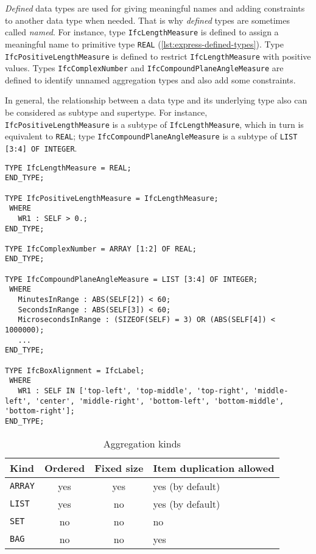 \emph{Defined} data types are used for giving meaningful names and adding constraints to another data type when needed.
That is why \emph{defined} types are sometimes called \emph{named}.
For instance, type \texttt{Ifc\-Length\-Measure} is defined to assign a meaningful name to primitive type \texttt{REAL} (\autoref{lst:express-defined-types}).
Type \texttt{Ifc\-Positive\-Length\-Measure} is defined to restrict \texttt{Ifc\-Length\-Measure} with positive values.
Types \texttt{Ifc\-Complex\-Number} and \texttt{Ifc\-Compound\-Plane\-Angle\-Measure} are defined to identify unnamed aggregation types and also add some constraints.

In general, the relationship between a data type and its underlying type also can be considered as subtype and supertype.
For instance, \texttt{IfcPositiveLengthMeasure} is a subtype of \texttt{IfcLengthMeasure}, which in turn is equivalent to \texttt{REAL}; type \texttt{IfcCompoundPlaneAngleMeasure} is a subtype of \texttt{LIST [3:4] OF INTEGER}.



\begin{lstlisting}[caption={Printout of several defined data types},label=lst:express-defined-types]
TYPE IfcLengthMeasure = REAL;
END_TYPE;

TYPE IfcPositiveLengthMeasure = IfcLengthMeasure;
 WHERE
   WR1 : SELF > 0.;
END_TYPE;

TYPE IfcComplexNumber = ARRAY [1:2] OF REAL;
END_TYPE;

TYPE IfcCompoundPlaneAngleMeasure = LIST [3:4] OF INTEGER;
 WHERE
   MinutesInRange : ABS(SELF[2]) < 60;
   SecondsInRange : ABS(SELF[3]) < 60;
   MicrosecondsInRange : (SIZEOF(SELF) = 3) OR (ABS(SELF[4]) < 1000000);
   ...
END_TYPE;

TYPE IfcBoxAlignment = IfcLabel;
 WHERE
   WR1 : SELF IN ['top-left', 'top-middle', 'top-right', 'middle-left', 'center', 'middle-right', 'bottom-left', 'bottom-middle', 'bottom-right'];
END_TYPE;
\end{lstlisting}


\begin{table}\footnotesize
    \centering
    \caption{Aggregation kinds}
    \label{tab:express-aggregation-types}
    
    
    \begin{tabu} to \columnwidth { l c c X[c] }
        \hline
            Kind     &   Ordered & Fixed size    & Item duplication allowed  \\
        \hline
            \texttt{ARRAY}  &   yes     & yes           & yes (by default)          \\
            \texttt{LIST}   &   yes     & no            & yes (by default)          \\
            \texttt{SET}    &   no      & no            & no                        \\
            \texttt{BAG}    &   no      & no            & yes                       \\
        \hline
    \end{tabu}
\end{table}



